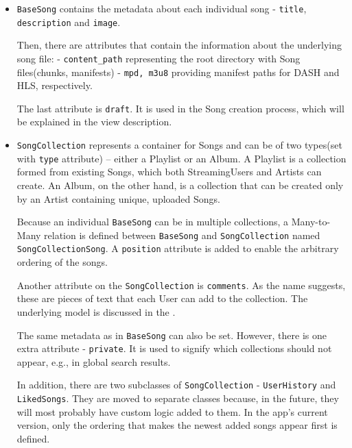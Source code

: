 \begin{itemize}

    \item
    \texttt{BaseSong} contains the metadata about each individual song - \texttt{title},
    \texttt{description} and \texttt{image}.

    Then, there are attributes that contain the information about the underlying song file:
    - \texttt{content\_path} representing the root directory with Song files(chunks, manifests)
    - \texttt{mpd, m3u8} providing manifest paths for DASH and HLS, respectively.

    The last attribute is \texttt{draft}. It is used in the Song creation process, which will be explained in the
    view description.

    \item
    \texttt{SongCollection} represents a container for Songs and can be of two types(set with \texttt{type} attribute)
    -- either a Playlist or an Album.
    A Playlist is a collection formed from existing Songs, which both StreamingUsers and Artists can create. An Album, on the other hand, is a collection that can be created only by an Artist
    containing unique, uploaded Songs.

    Because an individual \texttt{BaseSong} can be in multiple collections, a Many-to-Many relation is defined between
    \texttt{BaseSong} and \texttt{SongCollection} named \texttt{SongCollectionSong}.
    A \texttt{position} attribute is added to enable the arbitrary ordering of the songs.

    Another attribute on the \texttt{SongCollection} is \texttt{comments}.
    As the name suggests, these are pieces of text that each User can add to the collection. The underlying
    model is discussed in the .

    The same metadata as in \texttt{BaseSong} can also be set.
    However, there is one extra attribute - \texttt{private}.
    It is used to signify which collections should not appear, e.g., in global search results.

    In addition, there are two subclasses of \texttt{SongCollection} - \texttt{UserHistory} and \texttt{LikedSongs}.
    They are moved to separate classes because, in the future, they will most probably have custom logic added to them.
    In the app's current version, only the ordering that makes the newest added songs appear first is defined.

\end{itemize}

